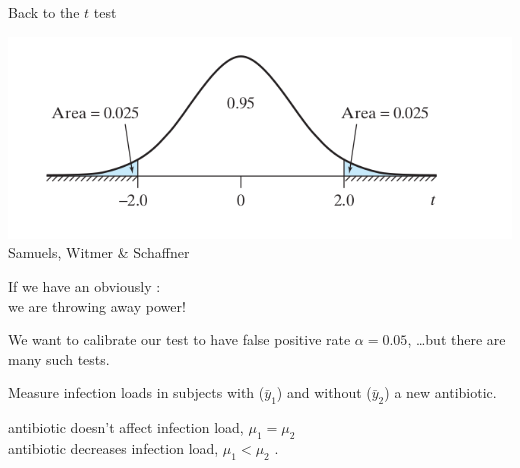 \begin{frame}{Back to the $t$ test}


    \begin{center}
        \includegraphics[width=.75\textwidth]{two-tailed-t}
        \flushright \tiny {Samuels, Witmer \& Schaffner}
    \end{center}
    
    If we have an obviously :\\
    we are throwing away power!

    \vspace{2em}

     We want to calibrate our test
    to have \alert{false positive rate} $\alpha=0.05$,
    \ldots but there are many such tests.

    \vspace{2em}
    \pause

    Measure infection loads in subjects with ($\bar y_1$) and without ($\bar y_2$) a new antibiotic. 

    \vspace{1em}

     antibiotic doesn't affect infection load, $\mu_1 = \mu_2$ \\
     antibiotic decreases infection load, $\mu_1< \mu_2$ .

\end{frame}

